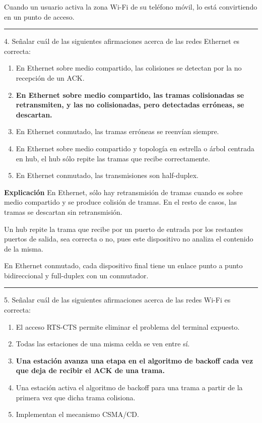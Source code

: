 \documentclass[10pt,a4paper]{article}
\begin{document}
Cuando un usuario activa la zona Wi-Fi de su teléfono móvil, lo está convirtiendo en un punto de acceso.

\vspace{15pt} \hrule \vspace{15pt}




4.  Señalar cuál de las siguientes afirmaciones acerca de las redes Ethernet es correcta:

\begin{enumerate}[label=\alph*]
    \item En Ethernet sobre medio compartido, las colisiones se detectan por la no recepción de un ACK.
    \item \textbf{En Ethernet sobre medio compartido, las tramas colisionadas se retransmiten, y las no colisionadas, pero detectadas erróneas, se descartan.}
    \item En Ethernet conmutado, las tramas erróneas se reenvían siempre.
    \item En Ethernet sobre medio compartido y topología en estrella o árbol centrada en hub, el hub sólo repite las tramas que recibe correctamente.
    \item En Ethernet conmutado, las transmisiones son half-duplex.
\end{enumerate}

\textbf{Explicación}
En Ethernet, sólo hay retransmisión de tramas cuando es sobre medio compartido y se produce colisión de tramas. En el resto de casos, las tramas se descartan sin retransmisión.

Un hub repite la trama que recibe por un puerto de entrada por los restantes puertos de salida, sea correcta o no, pues este dispositivo no analiza el contenido de la misma.

En Ethernet conmutado, cada dispositivo final tiene un enlace punto a punto bidireccional y full-duplex con un conmutador.

\vspace{15pt} \hrule \vspace{15pt}




5.  Señalar cuál de las siguientes afirmaciones acerca de las redes Wi-Fi es correcta:

\begin{enumerate}[label=\alph*]
    \item El acceso RTS-CTS permite eliminar el problema del terminal expuesto.
    \item Todas las estaciones de una misma celda se ven entre sí.
    \item \textbf{Una estación avanza una etapa en el algoritmo de backoff cada vez que deja de recibir el ACK de una trama.}
    \item Una estación activa el algoritmo de backoff para una trama a partir de la primera vez que dicha trama colisiona.
    \item Implementan el mecanismo CSMA/CD.
\end{enumerate}
\end{document}
